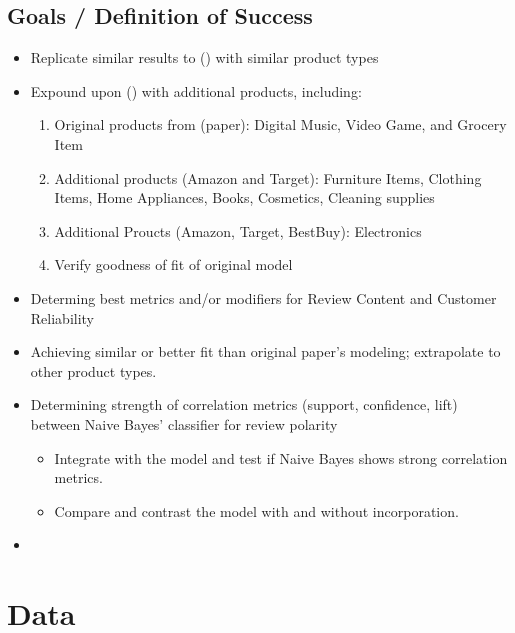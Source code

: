 \documentclass[
  letterpaper,
  DIV=11,
  numbers=noendperiod]{scrreprt}
\begin{document}
\section{Goals / Definition of
Success}\label{goals-definition-of-success}

\begin{itemize}
\item
  Replicate similar results to
  () with similar product types
\item
  Expound upon () with
  additional products, including:

  \begin{enumerate}
  \def\labelenumi{\alph{enumi}.}
  \item
    Original products from (paper): Digital Music, Video Game, and
    Grocery Item
  \item
    Additional products (Amazon and Target): Furniture Items, Clothing
    Items, Home Appliances, Books, Cosmetics, Cleaning supplies
  \item
    Additional Proucts (Amazon, Target, BestBuy): Electronics
  \item
    Verify goodness of fit of original model
  \end{enumerate}
\item
  Determing best metrics and/or modifiers for Review Content and
  Customer Reliability
\item
  Achieving similar or better fit than original paper's modeling;
  extrapolate to other product types.
\end{itemize}

\begin{itemize}
\item
  Determining strength of correlation metrics (support, confidence,
  lift) between Naive Bayes' classifier for review polarity

  \begin{itemize}
  \item
    Integrate with the model and test if Naive Bayes shows strong
    correlation metrics.
  \item
    Compare and contrast the model with and without incorporation.
  \end{itemize}
\item
\end{itemize}


\chapter{Data}\label{sec-data}
\end{document}
